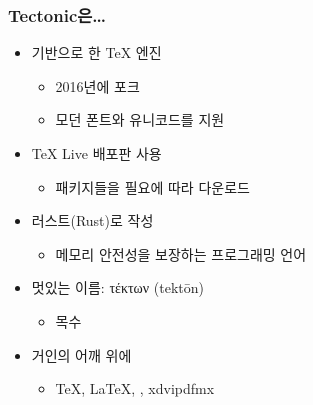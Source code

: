 \begin{frame}[c]
  \frametitle{Tectonic은\ldots}

  \begin{itemize}
    \item<1->  기반으로 한 \TeX{} 엔진
      \begin{itemize}
        \item 2016년에  포크
        \item 모던 폰트와 유니코드를 지원
      \end{itemize}

    \item<1-> \TeX{} Live 배포판 사용
      \begin{itemize}
        \item 패키지들을 필요에 따라 다운로드
      \end{itemize}

    \item<2-> 러스트(Rust)로 작성
      \begin{itemize}
        \item 메모리 안전성을 보장하는 프로그래밍 언어
      \end{itemize}

    \item<3-> 멋있는 이름: τέκτων (tektōn)
      \begin{itemize}
        \item 목수
      \end{itemize}

    \item<3-> 거인의 어깨 위에
      \begin{itemize}
        \item \TeX, \LaTeX, \XeTeX, xdvipdfmx
      \end{itemize}
  \end{itemize}
\end{frame}

